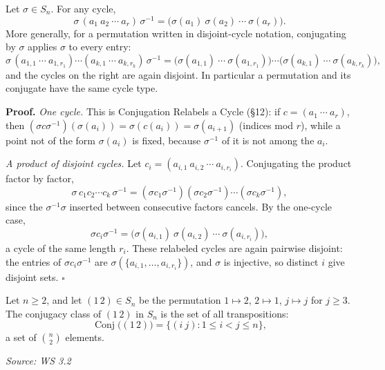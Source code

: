 \documentclass[11pt]{report}
\renewenvironment{proof}[1][Proof]{\noindent\textbf{#1.} }{\hfill$\square$\par\vspace{5pt}}
\newcommand{\srcline}[1]{\par\hfill{\footnotesize\textit{Source: #1}}}
\begin{document}
\begin{lembox}\label{lem:conjugation-relabels-entries}
Let $\sigma \in S_n$. For any cycle,
\[ \sigma\,(a_1\ a_2\ \cdots\ a_r)\,\sigma^{-1} = \big(\sigma(a_1)\ \sigma(a_2)\ \cdots\ \sigma(a_r)\big). \]
More generally, for a permutation written in disjoint-cycle notation, conjugating by $\sigma$ applies $\sigma$ to every entry:
\[ \sigma\,(a_{1,1}\ \cdots\ a_{1,r_1}) \cdots (a_{k,1}\ \cdots\ a_{k,r_k})\,\sigma^{-1} = \big(\sigma(a_{1,1})\ \cdots\ \sigma(a_{1,r_1})\big) \cdots \big(\sigma(a_{k,1})\ \cdots\ \sigma(a_{k,r_k})\big), \]
and the cycles on the right are again disjoint. In particular a permutation and its conjugate have the same cycle type.
\end{lembox}

\begin{proof}
\emph{One cycle.} This is Conjugation Relabels a Cycle (\S12): if $c = (a_1\ \cdots\ a_r)$, then $(\sigma c \sigma^{-1})(\sigma(a_i)) = \sigma(c(a_i)) = \sigma(a_{i+1})$ (indices mod $r$), while a point not of the form $\sigma(a_i)$ is fixed, because $\sigma^{-1}$ of it is not among the $a_i$.

\emph{A product of disjoint cycles.} Let $c_i = (a_{i,1}\ a_{i,2}\ \cdots\ a_{i,r_i})$. Conjugating the product factor by factor,
\[ \sigma\, c_1 c_2 \cdots c_k\, \sigma^{-1} = (\sigma c_1 \sigma^{-1})(\sigma c_2 \sigma^{-1}) \cdots (\sigma c_k \sigma^{-1}), \]
since the $\sigma^{-1}\sigma$ inserted between consecutive factors cancels. By the one-cycle case,
\[ \sigma c_i \sigma^{-1} = \big(\sigma(a_{i,1})\ \sigma(a_{i,2})\ \cdots\ \sigma(a_{i,r_i})\big), \]
a cycle of the same length $r_i$. These relabeled cycles are again pairwise disjoint: the entries of $\sigma c_i \sigma^{-1}$ are $\sigma(\{a_{i,1}, \ldots, a_{i,r_i}\})$, and $\sigma$ is injective, so distinct $i$ give disjoint sets.
\end{proof}

\begin{propbox}\label{prop:conjugacy-class-1-2-sn}
Let $n \geq 2$, and let $(1\,2) \in S_n$ be the permutation $1 \mapsto 2$, $2 \mapsto 1$, $j \mapsto j$ for $j \geq 3$. The conjugacy class of $(1\,2)$ in $S_n$ is the set of all transpositions:
\[ \operatorname{Conj}\big((1\,2)\big) = \{ (i\ j) : 1 \leq i < j \leq n \}, \]
a set of $\binom{n}{2}$ elements.
\srcline{WS 3.2}
\end{propbox}
\end{document}
